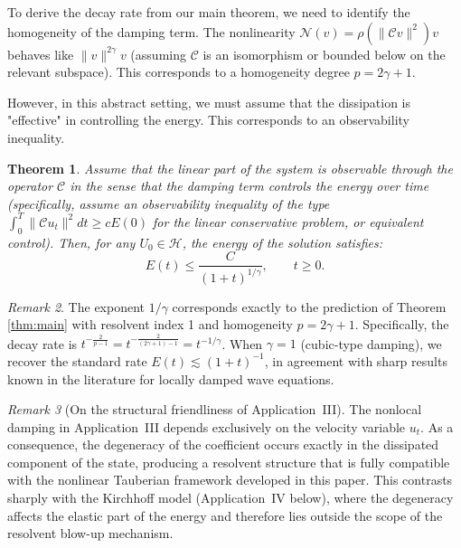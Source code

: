 \documentclass[11pt,reqno]{amsart}
\newtheorem{theorem}{Theorem}[section]
\theoremstyle{remark}
\newtheorem{remark}[theorem]{Remark}
\begin{document}
To derive the decay rate from our main theorem, we need to identify the homogeneity of the damping term. The nonlinearity $\mathcal{N}(v) = \rho(\|\mathcal C v\|^2)v$ behaves like $\|v\|^{2\gamma} v$ (assuming $\mathcal{C}$ is an isomorphism or bounded below on the relevant subspace). This corresponds to a homogeneity degree $p = 2\gamma + 1$.

However, in this abstract setting, we must assume that the dissipation is "effective" in controlling the energy. This corresponds to an observability inequality.

\begin{theorem}
Assume that the linear part of the system is observable through the operator $\mathcal{C}$ in the sense that the damping term controls the energy over time (specifically, assume an observability inequality of the type $\int_0^T \|\mathcal{C} u_t\|^2 dt \ge c E(0)$ for the linear conservative problem, or equivalent control).
Then, for any $U_0 \in \mathcal{H}$, the energy of the solution satisfies:
\begin{equation}\label{eq:decay_nonlocal}
E(t)\le \frac{C}{(1+t)^{1/\gamma}},\qquad t\ge0.
\end{equation}
\end{theorem}

\begin{remark}
The exponent $1/\gamma$ corresponds exactly to the prediction of Theorem \ref{thm:main} with resolvent index 1 and homogeneity $p=2\gamma+1$. Specifically, the decay rate is $t^{-\frac{2}{p-1}} = t^{-\frac{2}{(2\gamma+1)-1}} = t^{-1/\gamma}$.
When $\gamma=1$ (cubic-type damping), we recover the standard rate $E(t)\lesssim (1+t)^{-1}$, in agreement with sharp results known in the literature for locally damped wave equations.
\end{remark}


\begin{remark}[On the structural friendliness of Application~III]
The nonlocal damping in Application~III depends exclusively on the velocity
variable $u_t$. As a consequence, the degeneracy of the coefficient occurs
exactly in the dissipated component of the state, producing a resolvent
structure that is fully compatible with the nonlinear Tauberian framework
developed in this paper. This contrasts sharply with the Kirchhoff model
(Application~IV below), where the degeneracy affects the elastic part of the energy
and therefore lies outside the scope of the resolvent blow-up mechanism.
\end{remark}
\end{document}
